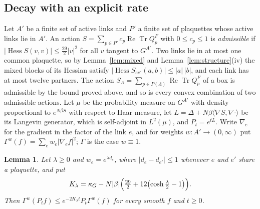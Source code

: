\documentclass[aps,prd,twocolumn,superscriptaddress,nofootinbib,longbibliography,floatfix,amsmath,amssymb,10pt]{revtex4-2}
\newtheorem{lemma}[theorem]{Lemma}
\theoremstyle{definition}
\theoremstyle{remark}
\newcommand{\ReTr}{\operatorname{Re}\operatorname{Tr}}
\newcommand{\Hess}{\operatorname{Hess}}
\newcommand{\ip}[2]{\langle #1,#2\rangle}
\begin{document}
\subsection{Decay with an explicit rate}

Let $A'$ be a finite set of active links and $P'$ a finite set of plaquettes
whose active links lie in $A'$. An action $S=\sum_{p\in P'}c_p\ReTr Q^F_p$
with $0\le c_p\le1$ is \emph{admissible} if $|\Hess S(v,v)|\le\frac{29}2|v|^2$
for all $v$ tangent to $G^{A'}$. Two links lie in at most one common
plaquette, so by Lemma~\ref{lem:mixed} and Lemma~\ref{lem:structure}(iv) the
mixed blocks of its Hessian satisfy
$|\Hess S_{ee'}(a,b)|\le|a|\,|b|$, and each link has at most twelve partners.
The action $S_\Lambda=\sum_{p\in P(\Lambda)}\ReTr Q^F_p$ of a box is
admissible by the bound proved above, and so is every convex combination of
two admissible actions. Let $\mu$ be the probability measure on $G^{A'}$ with
density proportional to $e^{N\beta S}$ with respect to Haar measure, let
$L=\Delta+N\beta\ip{\nabla S}{\nabla\cdot}$ be its Langevin generator, which is
self-adjoint in $L^2(\mu)$, and $P_t=e^{tL}$. Write $\nabla_e$ for the
gradient in the factor of the link $e$, and for weights $w:A'\to(0,\infty)$
put $\Gamma^w(f)=\sum_ew_e|\nabla_ef|^2$; $\Gamma$ is the case $w\equiv1$.

\begin{lemma}\label{lem:weighted}
Let $\lambda\ge0$ and $w_e=e^{\lambda d_e}$, where $|d_e-d_{e'}|\le1$ whenever
$e$ and $e'$ share a plaquette, and put
\[
K_\lambda=\kappa_G-N|\beta|\Bigl(\tfrac{29}2+12\bigl(\cosh\tfrac\lambda2-1\bigr)\Bigr).
\]
Then $\Gamma^w(P_tf)\le e^{-2K_\lambda t}P_t\Gamma^w(f)$ for every smooth $f$ and
$t\ge0$.
\end{lemma}
\end{document}
